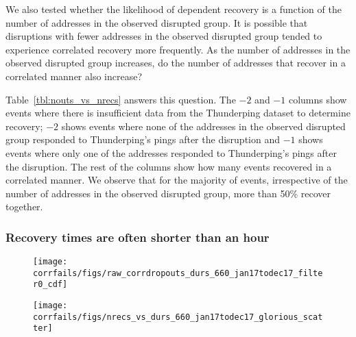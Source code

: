 We also tested whether the likelihood of dependent recovery is a
function of the number of addresses in the observed disrupted group.
%
It is possible
that disruptions with fewer addresses in the observed disrupted group
tended to experience correlated recovery more frequently. 
%
As the number of
addresses in the observed disrupted group increases, do the number of
addresses that recover in a correlated manner also increase?

Table~\ref{tbl:nouts_vs_nrecs} answers this question. The $-2$ and
$-1$ columns show events where there is insufficient data from the
Thunderping dataset to determine recovery; $-2$ shows events where
none of the addresses in the observed disrupted group responded to
Thunderping's pings after the disruption and $-1$ shows events where only
one of the addresses responded to Thunderping's pings after the
disruption. The rest of the columns show how many events recovered in a
correlated manner. We observe that for the majority of events,
irrespective of the number of addresses in the observed disrupted
group, more than 50\% recover together.


\subsubsection*{Recovery times are often shorter than an hour}


\begin{figure*}[t]
\begin{subfigure}[t]{0.47\linewidth}
\centering
\texttt{[image: corrfails/figs/raw\_corrdropouts\_durs\_660\_jan17todec17\_filter0\_cdf]}
\caption{
\label{fig:corrdropouts_durs}
}
\end{subfigure}
%
\hfill
%
\begin{subfigure}[t]{0.47\linewidth}
  \centering
  \texttt{[image: corrfails/figs/nrecs\_vs\_durs\_660\_jan17todec17\_glorious\_scatter]}
  \caption{
    \label{fig:nrecs_vs_durs}
}
\end{subfigure}
%
%
\caption[Durations of dependent disruption events]{
\label{fig:rec_durs}
(a)~The distribution of durations of dependent dropouts for all addresses that
recovered in a correlated manner. 60\% of addresses recovered in less than an hour.
(b)~For dependent dropout events where at least two addresses recovered,
this shows the number of addresses that recovered on the x-axis and the
corresponding recovery duration for the event on the y-axis. Dependent
dropout events vary in their duration irrespective of the number of
affected addresses.
}
\end{figure*}

